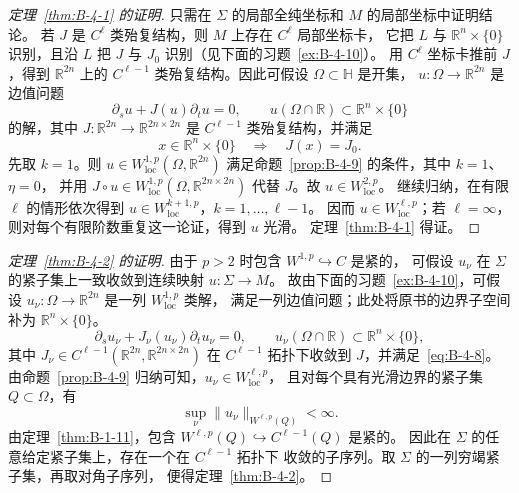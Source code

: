 \begin{proof}[定理~\ref{thm:B-4-1} 的证明]
只需在 $\Sigma$ 的局部全纯坐标和 $M$ 的局部坐标中证明结论。
若 $J$ 是 $C^\ell$ 类殆复结构，则 $M$ 上存在 $C^\ell$ 局部坐标卡，
它把 $L$ 与 $\mathbb R^n\times\{0\}$ 识别，且沿 $L$ 把 $J$ 与 $J_0$
识别（见下面的习题~\ref{ex:B-4-10}）。
用 $C^\ell$ 坐标卡推前 $J$，得到 $\mathbb R^{2n}$ 上的
$C^{\ell-1}$ 类殆复结构。因此可假设 $\Omega\subset\mathbb H$ 是开集，
$u:\Omega\to\mathbb R^{2n}$ 是边值问题
\[
  \partial_su+J(u)\partial_tu=0,\qquad
  u(\Omega\cap\mathbb R)\subset\mathbb R^n\times\{0\}
\]
的解，其中 $J:\mathbb R^{2n}\to\mathbb R^{2n\times2n}$
是 $C^{\ell-1}$ 类殆复结构，并满足
\begin{equation}\label{eq:B-4-8}
  x\in\mathbb R^n\times\{0\}\quad\Longrightarrow\quad J(x)=J_0.
\end{equation}
先取 $k=1$。则 $u\in W^{1,p}_{\mathrm{loc}}(\Omega,\mathbb R^{2n})$
满足命题~\ref{prop:B-4-9} 的条件，其中 $k=1$、$\eta=0$，
并用 $J\circ u\in W^{1,p}_{\mathrm{loc}}(\Omega,\mathbb R^{2n\times2n})$
代替 $J$。故 $u\in W^{2,p}_{\mathrm{loc}}$。
继续归纳，在有限 $\ell$ 的情形依次得到
$u\in W^{k+1,p}_{\mathrm{loc}}$，$k=1,\ldots,\ell-1$。
因而 $u\in W^{\ell,p}_{\mathrm{loc}}$；若 $\ell=\infty$，
则对每个有限阶数重复这一论证，得到 $u$ 光滑。
定理~\ref{thm:B-4-1} 得证。
\end{proof}

\begin{proof}[定理~\ref{thm:B-4-2} 的证明]
由于 $p>2$ 时包含 $W^{1,p}\hookrightarrow C$ 是紧的，
可假设 $u_\nu$ 在 $\Sigma$ 的紧子集上一致收敛到连续映射
$u:\Sigma\to M$。
故由下面的习题~\ref{ex:B-4-10}，可假设
$u_\nu:\Omega\to\mathbb R^{2n}$ 是一列 $W^{1,p}_{\mathrm{loc}}$ 类解，
满足一列边值问题；此处将原书的边界子空间补为
$\mathbb R^n\times\{0\}$。
\[
  \partial_su_\nu+J_\nu(u_\nu)\partial_tu_\nu=0,\qquad
  u_\nu(\Omega\cap\mathbb R)\subset\mathbb R^n\times\{0\},
\]
其中 $J_\nu\in C^{\ell-1}(\mathbb R^{2n},\mathbb R^{2n\times2n})$
在 $C^{\ell-1}$ 拓扑下收敛到 $J$，并满足~\eqref{eq:B-4-8}。
由命题~\ref{prop:B-4-9} 归纳可知，$u_\nu\in W^{\ell,p}_{\mathrm{loc}}$，
且对每个具有光滑边界的紧子集 $Q\subset\Omega$，有
\[
  \sup_\nu\|u_\nu\|_{W^{\ell,p}(Q)}<\infty.
\]
由定理~\ref{thm:B-1-11}，包含
$W^{\ell,p}(Q)\hookrightarrow C^{\ell-1}(Q)$ 是紧的。
因此在 $\Sigma$ 的任意给定紧子集上，存在一个在 $C^{\ell-1}$ 拓扑下
收敛的子序列。取 $\Sigma$ 的一列穷竭紧子集，再取对角子序列，
便得定理~\ref{thm:B-4-2}。
\end{proof}

